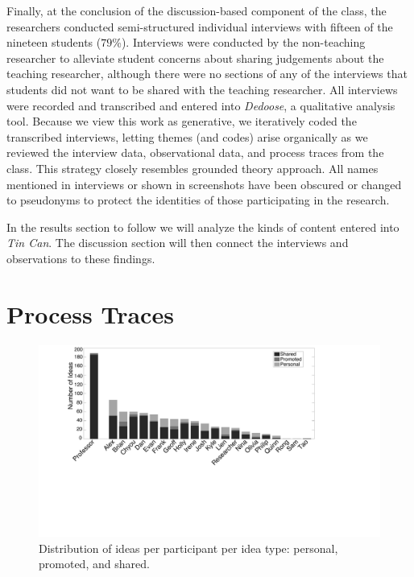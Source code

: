 Finally, at the conclusion of the discussion-based component of the class, the researchers conducted semi-structured individual interviews with fifteen of the nineteen students ($79$\%). Interviews were conducted by the non-teaching researcher to alleviate student concerns about sharing judgements about the teaching researcher, although there were no sections of any of the interviews that students did not want to be shared with the teaching researcher. All interviews were recorded and transcribed and entered into \emph{Dedoose}, a qualitative analysis tool. Because we view this work as generative, we iteratively coded the transcribed interviews, letting themes (and codes) arise organically as we reviewed the interview data, observational data, and process traces from the class. This strategy closely resembles  grounded theory approach. All names mentioned in interviews or shown in screenshots have been obscured or changed to pseudonyms to protect the identities of those participating in the research.

In the results section to follow we will analyze the kinds of content entered into \emph{Tin Can}.  The discussion section will then connect the interviews and observations to these findings.  


\section{Process Traces}

\begin{figure}[p]
\centering
\includegraphics{figures/tincan/ideas_per_participant.pdf}
\caption{Distribution of ideas per participant per idea type: personal, promoted, and shared.}
\label{f:ideas_per_participant}
\end{figure}

